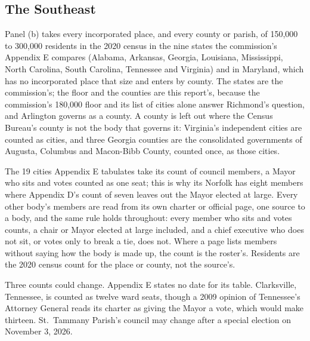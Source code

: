 \subsection{The Southeast}
Panel (b) takes every incorporated place, and every county or parish, of 150,000 to
300,000 residents in the 2020 census in the nine states the commission's Appendix E
compares (Alabama, Arkansas, Georgia, Louisiana, Mississippi, North Carolina, South
Carolina, Tennessee and Virginia) and in Maryland, which has no incorporated place
that size and enters by county. The states are the commission's; the floor and the
counties are this report's, because the commission's 180,000 floor and its list of
cities alone answer Richmond's question, and Arlington governs as a county. A county
is left out where the Census Bureau's county is not the body that governs it:
Virginia's independent cities are counted as cities, and three Georgia counties are
the consolidated governments of Augusta, Columbus and Macon-Bibb County, counted once,
as those cities.

The 19 cities Appendix E tabulates take its count of council
members,\autocite[122]{richmond2023} a Mayor who sits and votes counted as one seat;
this is why its Norfolk has eight members where Appendix D's count of seven leaves
out the Mayor elected at large. Every other body's members are read from its own
charter or official page, one source to a body, and the same rule holds throughout:
every member who sits and votes counts, a chair or Mayor elected at large included,
and a chief executive who does not sit, or votes only to break a tie, does not.
Where a page lists members without saying how the body is made up, the count is the
roster's. Residents are the 2020 census count for the place or county, not the
source's.

Three counts could change. Appendix E states no date for its table. Clarksville,
Tennessee, is counted as twelve ward seats, though a 2009 opinion of Tennessee's
Attorney General reads its charter as giving the Mayor a vote, which would make
thirteen. St.~Tammany Parish's council may change after a special election on
November 3, 2026.

